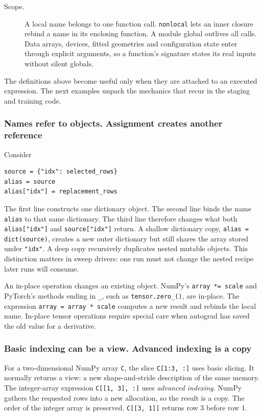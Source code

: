 \documentclass[10pt,aps,prd,twocolumn,nofootinbib]{revtex4-2}
\newcommand{\code}[1]{\texttt{#1}}
\begin{document}
\begin{description}
  \item[Scope.] A local name belongs to one function call.  \code{nonlocal}
  lets an inner closure rebind a name in its enclosing function.  A module
  global outlives all calls.  Data arrays, devices, fitted geometries and
  configuration state enter through explicit arguments, so a function's
  signature states its real inputs without silent globals.
\end{description}

The definitions above become useful only when they are attached to an
executed expression.  The next examples unpack the mechanics that recur in
the staging and training code.

\subsubsection{Names refer to objects.  Assignment creates another reference}

Consider
\begin{verbatim}
source = {"idx": selected_rows}
alias = source
alias["idx"] = replacement_rows
\end{verbatim}
The first line constructs one dictionary object.  The second line binds the
name \code{alias} to that same dictionary.
The third line therefore changes what both \code{alias["idx"]} and
\code{source["idx"]} return.  A shallow dictionary copy,
\code{alias = dict(source)}, creates a new outer dictionary but still shares
the array stored under \code{"idx"}.  A deep copy recursively duplicates
nested mutable objects.  This distinction matters in sweep drivers: one run
must not change the nested recipe later runs will consume.

An in-place operation changes an existing object.  NumPy's
\code{array *= scale} and PyTorch's methods ending in \code{\_}, such as
\code{tensor.zero\_()}, are in-place.  The expression
\code{array = array * scale} computes a new result and rebinds the local
name.  In-place tensor operations require special care when autograd has saved
the old value for a derivative.

\subsubsection{Basic indexing can be a view.  Advanced indexing is a copy}

For a two-dimensional NumPy array \code{C}, the slice \code{C[1:3, :]} uses
basic slicing.  It normally returns a view: a new shape-and-stride description
of the same memory.  The integer-array expression \code{C[[1, 3], :]}
uses \emph{advanced indexing}.  NumPy gathers the requested rows into a new
allocation, so the result is a copy.  The order of the integer array is
preserved.  \code{C[[3, 1]]} returns row 3 before row 1.
\end{document}
